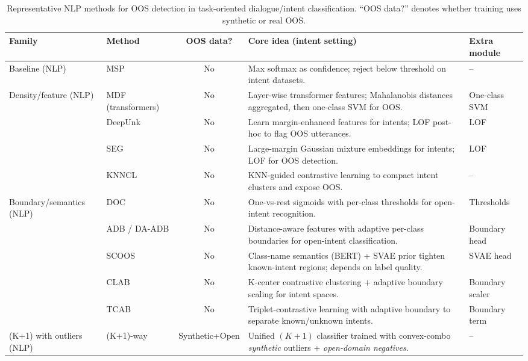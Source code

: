 \documentclass[journal,letterpaper]{IEEEtran}
\begin{document}
\begin{table}[t]
\centering
\caption{Representative NLP methods for OOS detection in task-oriented dialogue/intent classification. “OOS data?” denotes whether training uses synthetic or real OOS.}
\label{tab:nlp_oos_dialogue}
\renewcommand{\arraystretch}{.8}
\setlength{\tabcolsep}{2.0pt}
\footnotesize
\begin{tabular}{@{}l l c p{5.3cm} p{2cm}@{}}
\toprule
\textbf{Family} & \textbf{Method} & \textbf{OOS data?} & \textbf{Core idea (intent setting)} & \textbf{Extra module} \\
\midrule
Baseline (NLP) 
& MSP \cite{hendrycks2018baseline} & No & Max softmax as confidence; reject below threshold on intent datasets. & -- \\
\midrule
Density/feature (NLP)
& MDF (transformers) \cite{xu-etal-2021-unsupervised} & No & Layer-wise transformer features; Mahalanobis distances aggregated, then one-class SVM for OOS. & One-class SVM \\
& DeepUnk \cite{lin-xu-2019-deep} & No & Learn margin-enhanced features for intents; LOF post-hoc to flag OOS utterances. & LOF \\
& SEG \cite{yan-etal-2020-unknown} & No & Large-margin Gaussian mixture embeddings for intents; LOF for OOS detection. & LOF \\
& KNNCL \cite{zhou-etal-2022-knn} & No & KNN-guided contrastive learning to compact intent clusters and expose OOS. & -- \\
\midrule
Boundary/semantics (NLP)
& DOC \cite{shu-etal-2017-doc} & No & One-vs-rest sigmoids with per-class thresholds for open-intent recognition. & Thresholds \\
& ADB / DA-ADB \cite{Zhang_2021,DA-ADB_2023} & No & Distance-aware features with adaptive per-class boundaries for open-intent classification. & Boundary head \\
& SCOOS \cite{gautam2024scoos} & No & Class-name semantics (BERT) + SVAE prior tighten known-intent regions; depends on label quality. & SVAE head \\
& CLAB \cite{liu2023clab} & No & K-center contrastive clustering + adaptive boundary scaling for intent spaces. & Boundary scaler \\
& TCAB \cite{chen2024tcab} & No & Triplet-contrastive learning with adaptive boundary to separate known/unknown intents. & Boundary term \\
\midrule
(K$+$1) with outliers (NLP)
& (K$+$1)-way \cite{Zhan_2021} & Synthetic+Open & Unified $(K{+}1)$ classifier trained with convex-combo \emph{synthetic} outliers + \emph{open-domain negatives}. & -- \\

\end{tabular}
\end{table}
\end{document}
